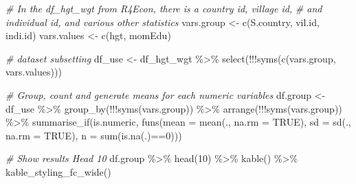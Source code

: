 \documentclass[
]{book}
\newenvironment{Shaded}{\begin{snugshade}}{\end{snugshade}}
\newcommand{\AttributeTok}[1]{\textcolor[rgb]{0.77,0.63,0.00}{#1}}
\newcommand{\CommentTok}[1]{\textcolor[rgb]{0.56,0.35,0.01}{\textit{#1}}}
\newcommand{\ConstantTok}[1]{\textcolor[rgb]{0.00,0.00,0.00}{#1}}
\newcommand{\DecValTok}[1]{\textcolor[rgb]{0.00,0.00,0.81}{#1}}
\newcommand{\FunctionTok}[1]{\textcolor[rgb]{0.00,0.00,0.00}{#1}}
\newcommand{\NormalTok}[1]{#1}
\newcommand{\OtherTok}[1]{\textcolor[rgb]{0.56,0.35,0.01}{#1}}
\newcommand{\SpecialCharTok}[1]{\textcolor[rgb]{0.00,0.00,0.00}{#1}}
\newcommand{\StringTok}[1]{\textcolor[rgb]{0.31,0.60,0.02}{#1}}
\begin{document}
\begin{Shaded}
\begin{Highlighting}[]
\CommentTok{\# In the df\_hgt\_wgt from R4Econ, there is a country id, village id,}
\CommentTok{\# and individual id, and various other statistics}
\NormalTok{vars.group }\OtherTok{\textless{}{-}} \FunctionTok{c}\NormalTok{(}\StringTok{\textquotesingle{}S.country\textquotesingle{}}\NormalTok{, }\StringTok{\textquotesingle{}vil.id\textquotesingle{}}\NormalTok{, }\StringTok{\textquotesingle{}indi.id\textquotesingle{}}\NormalTok{)}
\NormalTok{vars.values }\OtherTok{\textless{}{-}} \FunctionTok{c}\NormalTok{(}\StringTok{\textquotesingle{}hgt\textquotesingle{}}\NormalTok{, }\StringTok{\textquotesingle{}momEdu\textquotesingle{}}\NormalTok{)}

\CommentTok{\# dataset subsetting}
\NormalTok{df\_use }\OtherTok{\textless{}{-}}\NormalTok{ df\_hgt\_wgt }\SpecialCharTok{\%\textgreater{}\%} \FunctionTok{select}\NormalTok{(}\SpecialCharTok{!!!}\FunctionTok{syms}\NormalTok{(}\FunctionTok{c}\NormalTok{(vars.group, vars.values)))}

\CommentTok{\# Group, count and generate means for each numeric variables}
\NormalTok{df.group }\OtherTok{\textless{}{-}}\NormalTok{ df\_use }\SpecialCharTok{\%\textgreater{}\%} \FunctionTok{group\_by}\NormalTok{(}\SpecialCharTok{!!!}\FunctionTok{syms}\NormalTok{(vars.group)) }\SpecialCharTok{\%\textgreater{}\%}
            \FunctionTok{arrange}\NormalTok{(}\SpecialCharTok{!!!}\FunctionTok{syms}\NormalTok{(vars.group)) }\SpecialCharTok{\%\textgreater{}\%}
            \FunctionTok{summarise\_if}\NormalTok{(is.numeric,}
                         \FunctionTok{funs}\NormalTok{(}\AttributeTok{mean =} \FunctionTok{mean}\NormalTok{(., }\AttributeTok{na.rm =} \ConstantTok{TRUE}\NormalTok{),}
                              \AttributeTok{sd =} \FunctionTok{sd}\NormalTok{(., }\AttributeTok{na.rm =} \ConstantTok{TRUE}\NormalTok{),}
                              \AttributeTok{n =} \FunctionTok{sum}\NormalTok{(}\FunctionTok{is.na}\NormalTok{(.)}\SpecialCharTok{==}\DecValTok{0}\NormalTok{)))}

\CommentTok{\# Show results Head 10}
\NormalTok{df.group }\SpecialCharTok{\%\textgreater{}\%} \FunctionTok{head}\NormalTok{(}\DecValTok{10}\NormalTok{) }\SpecialCharTok{\%\textgreater{}\%}
  \FunctionTok{kable}\NormalTok{() }\SpecialCharTok{\%\textgreater{}\%}
  \FunctionTok{kable\_styling\_fc\_wide}\NormalTok{()}
\end{Highlighting}
\end{Shaded}
\end{document}
